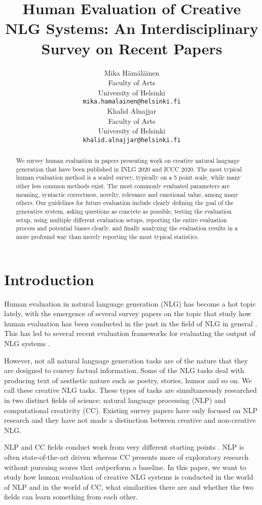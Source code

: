 \documentclass[11pt,a4paper]{article}
\title{Human Evaluation of Creative NLG Systems: An Interdisciplinary Survey on Recent Papers}
\author{Mika Hämäläinen \\
  Faculty of Arts \\
  University of Helsinki \\
  \texttt{mika.hamalainen@helsinki.fi} \\\And
  Khalid Alnajjar\\
  Faculty of Arts \\
  University of Helsinki \\
  \texttt{khalid.alnajjar@helsinki.fi} \\}
\date{}
\begin{document}
\maketitle
\begin{abstract}
We survey human evaluation in papers presenting work on creative natural language generation that have been published in INLG 2020 and ICCC 2020. The most typical human evaluation method is a scaled survey, typically on a 5 point scale, while many other less common methods exist. The most commonly evaluated parameters are meaning, syntactic correctness, novelty, relevance and emotional value, among many others. Our guidelines for future evaluation include clearly defining the goal of the generative system, asking questions as concrete as possible, testing the evaluation setup, using multiple different evaluation setups, reporting the entire evaluation process and potential biases clearly, and finally analyzing the evaluation results in a more profound way than merely reporting the most typical statistics.
\end{abstract}

\section{Introduction}

Human evaluation in natural language generation (NLG) has become a hot topic lately, with the emergence of several survey papers on the topic that study how human evaluation has been conducted in the past in the field of NLG in general \cite{howcroft-etal-2020-twenty,belz-etal-2020-disentangling}. This has led to several recent evaluation frameworks for evaluating the output of NLG systems \cite{liu2020glge,gehrmann2021gem}.

However, not all natural language generation tasks are of the nature that they are designed to convey factual information. Some of the NLG tasks deal with producing text of aesthetic nature such as poetry, stories, humor and so on. We call these creative NLG tasks. These types of tasks are simultaneously researched in two distinct fields of science: natural language processing (NLP) and computational creativity (CC). Existing survey papers have only focused on NLP research and they have not made a distinction between creative and non-creative NLG.

NLP and CC fields conduct work from very different starting points \cite{ws-2016-inlg}. NLP is often state-of-the-art driven whereas CC presents more of exploratory research without pursuing scores that outperform a baseline. In this paper, we want to study how human evaluation of creative NLG systems is conducted in the world of NLP and in the world of CC, what similarities there are and whether the two fields can learn something from each other.
\end{document}
